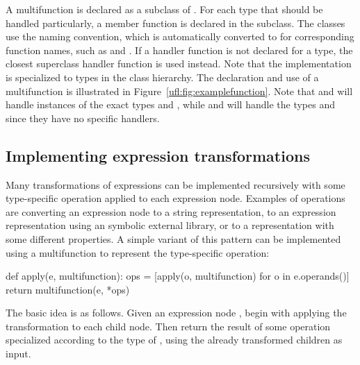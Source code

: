 A multifunction is declared as a subclass of
. For each type that should be handled
particularly, a member function is declared in the subclass.  The
 classes use the  naming convention,
which is automatically converted to  for
corresponding function names, such as  and
.  If a handler function is not declared for a
type, the closest superclass handler function is used instead.  Note
that the  implementation is specialized to types
in the  class hierarchy.  The declaration and use of a
multifunction is illustrated in Figure~\ref{ufl:fig:examplefunction}.
Note that  and  will handle
instances of the exact types  and ,
while  and  will handle the types
 and  since they have no
specific handlers.

\subsection{Implementing expression transformations} \label{ufl:sec:transformer}

Many transformations of expressions can be implemented recursively
with some type-specific operation applied to each expression node.
Examples of operations are converting an expression node to a string
representation, to an expression representation using an symbolic
external library, or to a \ufl{} representation with some different
properties.  A simple variant of this pattern can be implemented using
a multifunction to represent the type-specific operation:
\begin{python}
def apply(e, multifunction):
    ops = [apply(o, multifunction) for o in e.operands()]
    return multifunction(e, *ops)
\end{python}
The basic idea is as follows. Given an expression node ,
begin with applying the transformation to each child node.  Then
return the result of some operation specialized according to the type
of , using the already transformed children as input.


